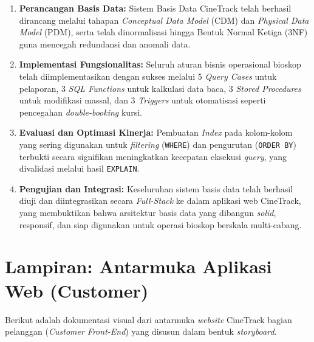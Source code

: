 \documentclass[letter,12pt,bahasa]{article}
\begin{document}
\begin{enumerate}
    \item \textbf{Perancangan Basis Data:} Sistem Basis Data CineTrack telah berhasil dirancang melalui tahapan \textit{Conceptual Data Model} (CDM) dan \textit{Physical Data Model} (PDM), serta telah dinormalisasi hingga Bentuk Normal Ketiga (3NF) guna mencegah redundansi dan anomali data.

    \item \textbf{Implementasi Fungsionalitas:} Seluruh aturan bisnis operasional bioskop telah diimplementasikan dengan sukses melalui 5 \textit{Query Cases} untuk pelaporan, 3 \textit{SQL Functions} untuk kalkulasi data baca, 3 \textit{Stored Procedures} untuk modifikasi massal, dan 3 \textit{Triggers} untuk otomatisasi seperti pencegahan \textit{double-booking} kursi.

    \item \textbf{Evaluasi dan Optimasi Kinerja:} Pembuatan \textit{Index} pada kolom-kolom yang sering digunakan untuk \textit{filtering} (\texttt{WHERE}) dan pengurutan (\texttt{ORDER BY}) terbukti secara signifikan meningkatkan kecepatan eksekusi \textit{query}, yang divalidasi melalui hasil \texttt{EXPLAIN}.

    \item \textbf{Pengujian dan Integrasi:} Keseluruhan sistem basis data telah berhasil diuji dan diintegrasikan secara \textit{Full-Stack} ke dalam aplikasi web CineTrack, yang membuktikan bahwa arsitektur basis data yang dibangun \textit{solid}, responsif, dan siap digunakan untuk operasi bioskop berskala multi-cabang.
\end{enumerate}


\newpage
\section*{Lampiran: Antarmuka Aplikasi Web (Customer)}

Berikut adalah dokumentasi visual dari antarmuka \textit{website} CineTrack bagian pelanggan (\textit{Customer Front-End}) yang disusun dalam bentuk \textit{storyboard}.
\end{document}
